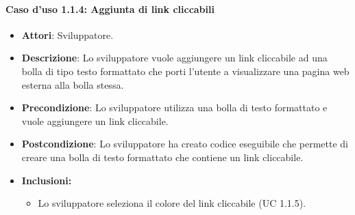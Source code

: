\paragraph{Caso d'uso 1.1.4: Aggiunta di link cliccabili}
\begin{itemize}
\item\textbf{Attori}: Sviluppatore.
\item\textbf{Descrizione}: Lo sviluppatore vuole aggiungere un link cliccabile ad una bolla di tipo testo formattato che porti l'utente a visualizzare una pagina web esterna alla bolla stessa.
\item\textbf{Precondizione}: Lo sviluppatore utilizza una bolla di testo formattato e vuole aggiungere un link cliccabile.
\item\textbf{Postcondizione}: Lo sviluppatore ha creato codice eseguibile che permette di creare una bolla di testo formattato che contiene un link cliccabile.

\item\textbf{Inclusioni:}
	\begin{itemize}
		\item Lo sviluppatore seleziona il colore del link cliccabile (UC 1.1.5).
	\end{itemize}

	
\end{itemize}